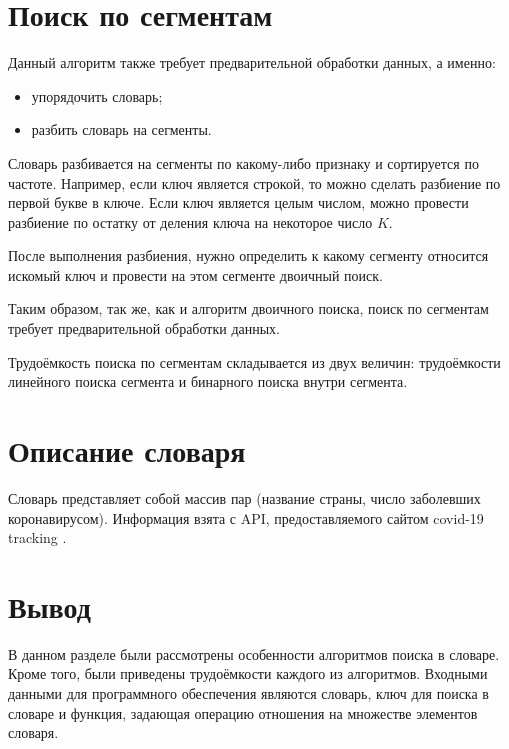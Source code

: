 \section{Поиск по сегментам}

Данный алгоритм также требует предварительной обработки данных, а именно:
\begin{itemize}
	\item упорядочить словарь;
	\item разбить словарь на сегменты.
\end{itemize}

Словарь разбивается на сегменты по какому-либо признаку и сортируется по частоте. Например, если ключ является строкой, то можно сделать разбиение по первой букве в ключе. Если ключ является целым числом, можно провести разбиение по остатку от деления ключа на некоторое число $K$.

После выполнения разбиения, нужно определить к какому сегменту относится искомый ключ и провести на этом сегменте двоичный поиск.

Таким образом, так же, как и алгоритм двоичного поиска, поиск по сегментам требует предварительной обработки данных. 

Трудоёмкость поиска по сегментам складывается из двух величин: трудоёмкости линейного поиска сегмента и бинарного поиска внутри сегмента.

\section{Описание словаря}
Словарь представляет собой массив пар (название страны, число заболевших коронавирусом). Информация взята с API, предоставляемого сайтом covid-19 tracking \cite{covid}.

\section*{Вывод}
В данном разделе были рассмотрены особенности алгоритмов поиска в словаре. Кроме того, были приведены трудоёмкости каждого из алгоритмов.
Входными данными для программного обеспечения являются словарь, ключ для поиска в словаре и функция, задающая операцию отношения на множестве элементов словаря.